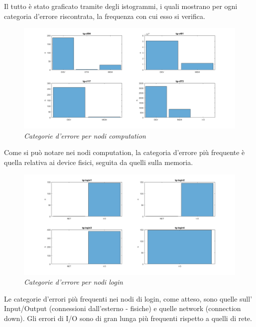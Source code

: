 Il tutto è stato graficato tramite degli istogrammi, i quali mostrano per ogni categoria d'errore riscontrata, la frequenza con cui esso si verifica.
\begin{figure}[H]
	\centering
	\includegraphics[width=\textwidth]{img/hw6/domanda5_1.png}
	\caption{\textit{Categorie d'errore per nodi computation}}
\end{figure}
Come si può notare nei nodi computation, la categoria d'errore più frequente è quella relativa ai device fisici, seguita da quelli sulla memoria.
\begin{figure}[H]
	\centering
	\includegraphics[width=\textwidth]{img/hw6/domanda5_2.png}
	\caption{\textit{Categorie d'errore per nodi login}}
\end{figure}
Le categorie d'errori più frequenti nei nodi di login, come atteso, sono quelle sull' Input/Output (connessioni dall'esterno - fisiche) e quelle network (connection down). Gli errori di I/O sono di gran lunga più frequenti rispetto a quelli di rete.